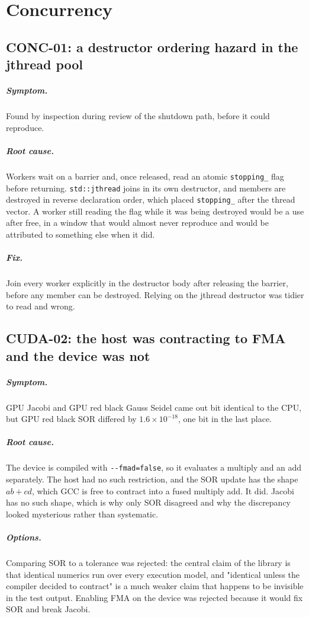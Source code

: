 \documentclass[11pt,a4paper]{report}
\newcommand{\symptom}[1]{\paragraph{Symptom.}#1}
\newcommand{\rootcause}[1]{\paragraph{Root cause.}#1}
\newcommand{\options}[1]{\paragraph{Options.}#1}
\newcommand{\fix}[1]{\paragraph{Fix.}#1}
\begin{document}
\chapter{Concurrency}

\section{CONC-01: a destructor ordering hazard in the jthread pool}

\symptom{Found by inspection during review of the shutdown path, before it could
reproduce.}

\rootcause{Workers wait on a barrier and, once released, read an atomic
\texttt{stopping\_} flag before returning. \texttt{std::jthread} joins in its own
destructor, and members are destroyed in reverse declaration order, which placed
\texttt{stopping\_} after the thread vector. A worker still reading the flag
while it was being destroyed would be a use after free, in a window that would
almost never reproduce and would be attributed to something else when it did.}

\fix{Join every worker explicitly in the destructor body after releasing the
barrier, before any member can be destroyed. Relying on the jthread destructor
was tidier to read and wrong.}

\section{CUDA-02: the host was contracting to FMA and the device was not}

\symptom{GPU Jacobi and GPU red black Gauss Seidel came out bit identical to the
CPU, but GPU red black SOR differed by $1.6\times10^{-18}$, one bit in the last
place.}

\rootcause{The device is compiled with \texttt{-{}-fmad=false}, so it evaluates a
multiply and an add separately. The host had no such restriction, and the SOR
update has the shape $ab + cd$, which GCC is free to contract into a fused
multiply add. It did. Jacobi has no such shape, which is why only SOR disagreed
and why the discrepancy looked mysterious rather than systematic.}

\options{Comparing SOR to a tolerance was rejected: the central claim of the
library is that identical numerics run over every execution model, and
"identical unless the compiler decided to contract" is a much weaker claim that
happens to be invisible in the test output. Enabling FMA on the device was
rejected because it would fix SOR and break Jacobi.}
\end{document}
